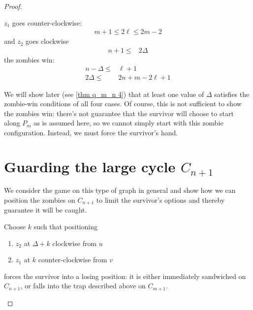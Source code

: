 \begin{proof}
\begin{proofpart}
  $z_1$ goes counter-clockwise:
  \begin{align*}
   m + 1 \leq 2 \ell \leq 2m - 2
  \end{align*}
  and $z_2$ goes clockwise
  \begin{align*}
   n+1 \leq & 2 \Delta
  \end{align*}
  the zombies win:
  \begin{align*}
   n - \Delta \leq & \ell + 1           \\
   2 \Delta \leq   & 2n + m - 2\ell + 1
  \end{align*}

We will show later (see \ref{thm q_m_n 4}) that at least one value of $\Delta$ satisfies the zombie-win conditions of all four cases. Of course, this is not sufficient to show the zombies win: there's not guarantee that the survivor will choose to start along $P_m$ as is assumed here, so we cannot simply start with this zombie configuration. Instead, we must force the survivor's hand.
\end{proofpart}

  \section{Guarding the large cycle $C_{n+1}$\label{thm q_m_n 2}}
\begin{proofpart}
  We consider the game on this type of graph in general and show
  how we can position the zombies on $C_{n+1}$ to limit the survivor's options and thereby guarantee it will be caught.


  Choose $k$ such that positioning
  \begin{enumerate}
   \item $z_2$ at $\Delta + k$ clockwise from $u$
   \item $z_1$ at $k$ counter-clockwise from $v$
  \end{enumerate}
  forces the survivor into a losing position: it is either immediately sandwiched on $C_{n+1}$,
  or falls into the trap described above on $C_{m+1}$.


\end{proofpart}
\end{proof}
